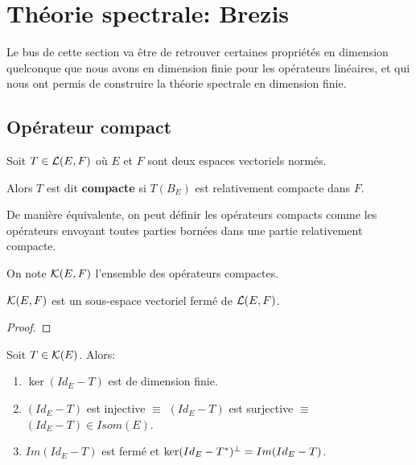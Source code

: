 \section{Théorie spectrale: Brezis}

Le bus de cette section va être de retrouver certaines propriétés en dimension
quelconque que nous avons en dimension finie pour les opérateurs linéaires, et
qui nous ont permis de construire la théorie spectrale en dimension finie.





\subsection{Opérateur compact}

\begin{definition}
	Soit $T \in \mathcal{L}(E, F)$ où $E$ et $F$ sont deux espaces
	vectoriels normés.

	Alors $T$ est dit \textbf{compacte} si $T(B_{E})$ est relativement compacte
	dans $F$.
\end{definition}

De manière équivalente, on peut définir les opérateurs compacts comme les
opérateurs envoyant toutes parties bornées dans une partie relativement
compacte.

On note $\mathcal{K}(E, F)$ l'ensemble des opérateurs compactes.

\begin{proposition}
	$\mathcal{K}(E, F)$ est un sous-espace vectoriel fermé de
	$\mathcal{L}(E, F)$.
\end{proposition}

\begin{proof}
	
\end{proof}

\begin{proposition}
	Soit $T \in \mathcal{K}(E)$. Alors:

\begin{enumerate}
	\item $\ker(Id_{E} - T)$ est de dimension finie.
	\item $(Id_{E} - T)$ est injective $\equiv$ $(Id_{E} - T)$ est surjective
		$\equiv$ $(Id_{E} - T) \in Isom(E)$.
	\item $Im(Id_{E} - T)$ est fermé et $\ker(Id_{E} - T^{*})^{\perp} = Im(Id_{E}
		- T)$.
\end{enumerate}
\end{proposition}

